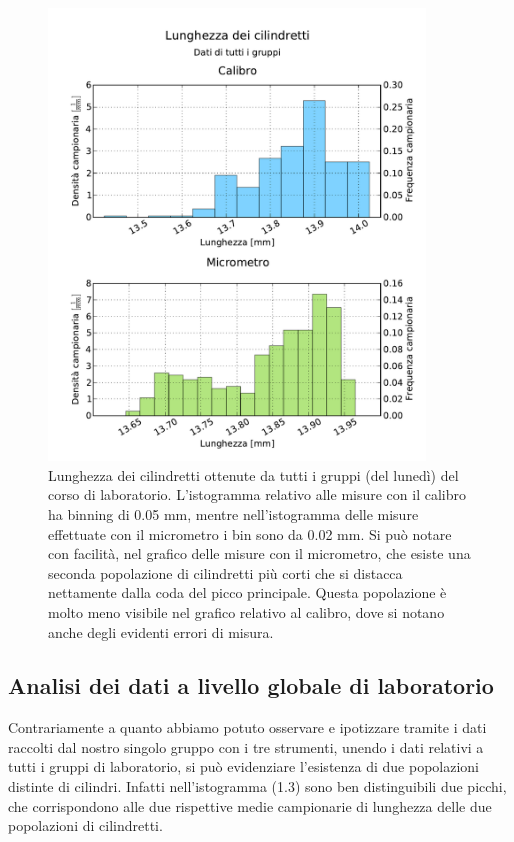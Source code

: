 \begin{figure}
	\centering
	\includegraphics[width=100mm]{grafici/cilindri_tutti_2.pdf}
    \caption{Lunghezza dei cilindretti ottenute da tutti i gruppi (del lunedì)
        del corso di laboratorio. L'istogramma relativo alle misure con il calibro
        ha binning di 0.05 mm, mentre nell'istogramma delle misure effettuate con
        il micrometro i bin sono da 0.02 mm. Si può notare con facilità, nel grafico
        delle misure con il micrometro, che esiste una seconda popolazione di
        cilindretti più corti che si distacca nettamente dalla coda del picco principale.
        Questa popolazione è molto meno visibile nel grafico relativo al calibro, dove si
        notano anche degli evidenti errori di misura.}
\end{figure}

\subsection{Analisi dei dati a livello globale di laboratorio}
Contrariamente a quanto abbiamo potuto osservare e ipotizzare tramite i dati
raccolti dal nostro singolo gruppo con i tre strumenti, unendo i dati relativi
a tutti i gruppi di laboratorio, si può evidenziare l'esistenza di due popolazioni
distinte di cilindri. Infatti nell'istogramma (1.3) sono ben distinguibili due picchi,
che corrispondono alle due rispettive medie campionarie di lunghezza delle due
popolazioni di cilindretti.

